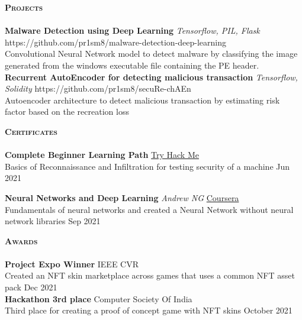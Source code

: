 \documentclass[a4paper]{article}
\newcommand{\lineunder} {
    \vspace*{-8pt} \\
    \hspace*{-18pt} \hrulefill \\
}
\newcommand{\header} [1] {
    {\hspace*{-18pt}\vspace*{6pt} \textbf{\textsc{#1}}}
    \vspace*{-6pt} \lineunder
}
\begin{document}
\header{Projects}
{\textbf{Malware Detection using Deep Learning}} {\sl Tensorflow, PIL, Flask} \hfill https://github.com/pr1sm8/malware-detection-deep-learning\\
Convolutional Neural Network model to detect malware by classifying the image generated from the windows executable file containing the PE header.\\
\vspace*{2mm}
{\textbf{Recurrent AutoEncoder for detecting malicious transaction}} {\sl Tensorflow, Solidity} \hfill https://github.com/pr1sm8/secuRe-chAEn\\
Autoencoder architecture to detect malicious transaction by estimating risk factor based on the recreation loss\\
\vspace*{2mm}

\header{Certificates}
\textbf{Complete Beginner Learning Path} \hfill \href{https://tryhackme.com/path/outline/beginner}{Try Hack Me} \\
Basics of Reconnaissance and Infiltration for testing security of a machine \hfill Jun 2021\\
\vspace*{2mm}

\textbf{Neural Networks and Deep Learning} {\sl Andrew NG} \hfill \href{https://www.coursera.org/learn/neural-networks-deep-learning}{Coursera} \\
Fundamentals of neural networks and created a Neural Network without neural network libraries \hfill Sep 2021\\
\vspace*{2mm}

\header{Awards}
\textbf{Project Expo Winner} \hfill IEEE CVR\\
Created an NFT skin marketplace across games that uses a common NFT asset pack \hfill Dec 2021\\
\vspace*{2mm}
\textbf{Hackathon 3rd place} \hfill Computer Society Of India\\
Third place for creating a proof of concept game with NFT skins \hfill October 2021\\
\vspace*{2mm}
\end{document}
